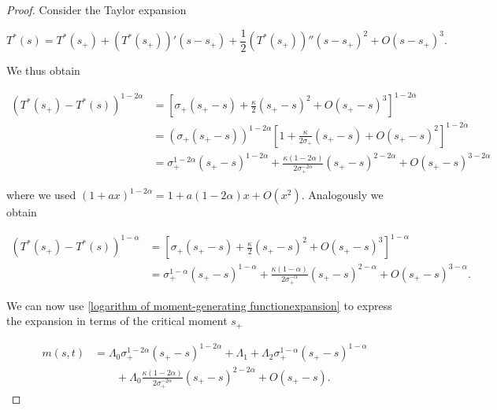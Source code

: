 \documentclass[12pt,twoside]{article}
\theoremstyle{plain}
\theoremstyle{plain}
\theoremstyle{definition}
\theoremstyle{remark}
\numberwithin{equation}{section}
\begin{document}
\begin{proof}

Consider the Taylor expansion

$$
T^*(s) = T^*(s_+) + (T^*(s_+))'(s-s_+) + \frac 12 (T^*(s_+))''(s-s_+)^2 + O(s-s_+)^3.
$$

\vspace{5pt}

\newpage

We thus obtain

$$
\begin{aligned}
(T^*(s_+)-T^*(s))^{1-2\alpha} &= \left[\sigma_+ (s_+ -s) + \frac \kappa 2 (s_+ - s)^2 + O(s_+-s)^3 \right]^{1-2\alpha}\\[5pt]
&= \left(\sigma_+ (s_+ -s)\right)^{1-2\alpha}\left[1 + \frac {\kappa}{2\sigma_+} (s_+ - s) + O(s_+-s)^2 \right]^{1-2\alpha} \\[5pt]
&=\sigma_+^{1-2\alpha}(s_+-s)^{1-2\alpha} + \frac{\kappa(1-2\alpha)}{2\sigma_+^{-2\alpha}} (s_+-s)^{2-2\alpha} + O(s_+-s)^{3-2\alpha}
\end{aligned}
$$

\vspace{10pt}

where we used $(1+ax)^{1-2\alpha} = 1 + a(1-2\alpha) x + O(x^2)$. Analogously we obtain

$$
\begin{aligned}
(T^*(s_+)-T^*(s))^{1-\alpha}&=\left[\sigma_+ (s_+ -s) + \frac \kappa 2 (s_+ - s)^2 + O(s_+-s)^3 \right]^{1-\alpha}\\[5pt]
&=\sigma_+^{1-\alpha}(s_+-s)^{1-\alpha}+\frac{\kappa(1-\alpha)}{2\sigma_+^{-\alpha}}(s_+-s)^{2-\alpha} + O(s_+-s)^{3-\alpha}.
\end{aligned}
$$

We can now use \eqref{logarithm of moment-generating functionexpansion} to express the expansion in terms of the critical moment $s_+$

\begin{equation}
\label{eq: expansion of the logarithm of moment-generating function in terms of the critical moment}
\begin{aligned}
m(s,t)&=\Lambda_0 \sigma_+^{1-2\alpha}(s_+-s)^{1-2\alpha} + \Lambda_1 + \Lambda_2\sigma_+^{1-\alpha}(s_+-s)^{1-\alpha} \\[5pt]
&\qquad+ \Lambda_0 \frac{\kappa (1-2\alpha)}{2\sigma_+^{-2\alpha}}(s_+-s)^{2-2\alpha} + O(s_+-s).
\end{aligned}
\end{equation}

\end{proof}
\end{document}
